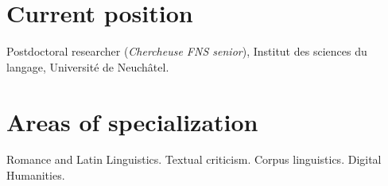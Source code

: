 \documentclass[11pt, a4paper]{article}
\newcommand{\years}[1]{\marginnote{\scriptsize #1}}
\begin{document}
\section{Current position}
\years{2021--}Postdoctoral researcher (\emph{Chercheuse FNS senior}), Institut des sciences du langage, Université de Neuchâtel.


\section{Areas of specialization}
Romance and Latin Linguistics. Textual criticism. Corpus linguistics. Digital Humanities.

\end{document}
